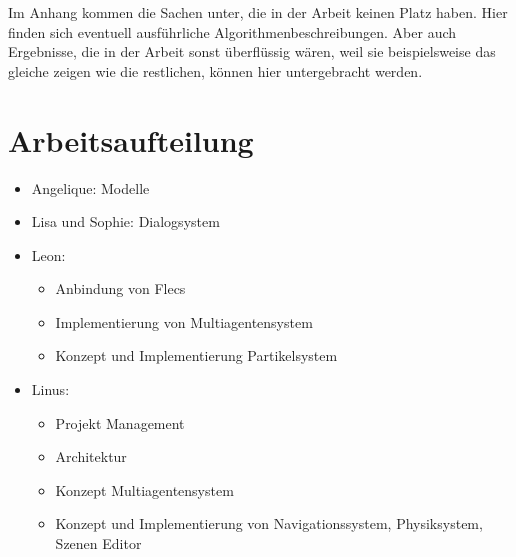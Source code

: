 
Im Anhang kommen die Sachen unter, die in der Arbeit keinen Platz haben. Hier finden sich eventuell ausführliche Algorithmenbeschreibungen. Aber auch Ergebnisse, die in der Arbeit sonst überflüssig wären, weil sie beispielsweise das gleiche zeigen wie die restlichen, können hier untergebracht werden.

\section{Arbeitsaufteilung}

\begin{itemize}
\item Angelique: Modelle
\item Lisa und Sophie: Dialogsystem
\item Leon:
\begin{itemize}
\item Anbindung von Flecs
\item Implementierung von Multiagentensystem
\item Konzept und Implementierung Partikelsystem
\end{itemize}
\item Linus:
\begin{itemize}
\item Projekt Management
\item Architektur
\item Konzept Multiagentensystem
\item Konzept und Implementierung von Navigationssystem, Physiksystem, Szenen Editor
\end{itemize}
\end{itemize}